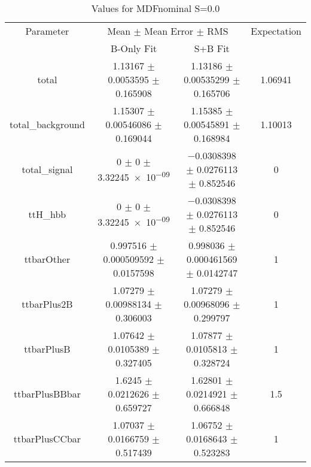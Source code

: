 \begin{table}
\centering
\caption{Values for MDFnominal S=0.0}
\begin{tabular}{cccc}
\toprule
Parameter & \multicolumn{2}{c}{Mean $\pm$ Mean Error $\pm$ RMS} & Expectation\\
 & B-Only Fit & S+B Fit & \\
\midrule
total & \num{1.13167} $\pm$ \num{0.0053595} $\pm$ \num{0.165908} & \num{1.13186} $\pm$ \num{0.00535299} $\pm$ \num{0.165706} & \num{1.06941}\\
total\_background & \num{1.15307} $\pm$ \num{0.00546086} $\pm$ \num{0.169044} & \num{1.15385} $\pm$ \num{0.00545891} $\pm$ \num{0.168984} & \num{1.10013}\\
total\_signal & \num{0} $\pm$ \num{0} $\pm$ \num{3.32245e-09} & \num{-0.0308398} $\pm$ \num{0.0276113} $\pm$ \num{0.852546} & \num{0}\\
ttH\_hbb & \num{0} $\pm$ \num{0} $\pm$ \num{3.32245e-09} & \num{-0.0308398} $\pm$ \num{0.0276113} $\pm$ \num{0.852546} & \num{0}\\
ttbarOther & \num{0.997516} $\pm$ \num{0.000509592} $\pm$ \num{0.0157598} & \num{0.998036} $\pm$ \num{0.000461569} $\pm$ \num{0.0142747} & \num{1}\\
ttbarPlus2B & \num{1.07279} $\pm$ \num{0.00988134} $\pm$ \num{0.306003} & \num{1.07279} $\pm$ \num{0.00968096} $\pm$ \num{0.299797} & \num{1}\\
ttbarPlusB & \num{1.07642} $\pm$ \num{0.0105389} $\pm$ \num{0.327405} & \num{1.07877} $\pm$ \num{0.0105813} $\pm$ \num{0.328724} & \num{1}\\
ttbarPlusBBbar & \num{1.6245} $\pm$ \num{0.0212626} $\pm$ \num{0.659727} & \num{1.62801} $\pm$ \num{0.0214921} $\pm$ \num{0.666848} & \num{1.5}\\
ttbarPlusCCbar & \num{1.07037} $\pm$ \num{0.0166759} $\pm$ \num{0.517439} & \num{1.06752} $\pm$ \num{0.0168643} $\pm$ \num{0.523283} & \num{1}\\
\bottomrule
\end{tabular}
\end{table}